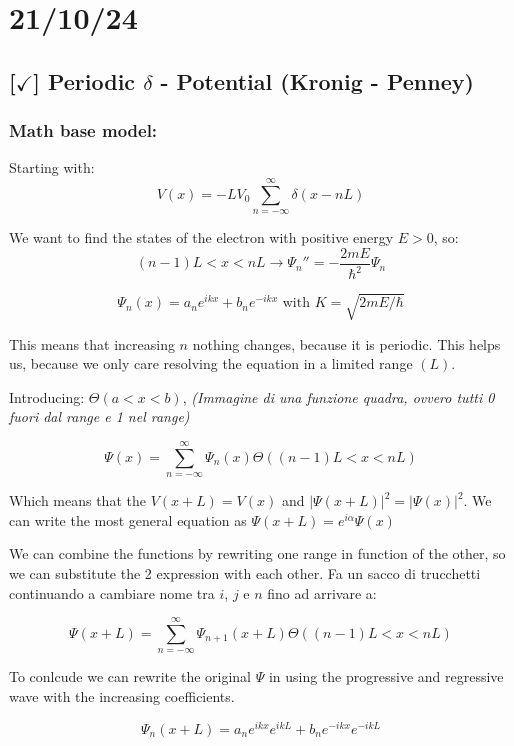 \section{21/10/24}

\subsection{[$\checkmark$] Periodic $\delta$ - Potential (Kronig - Penney)}
\subsubsection{Math base model: }

Starting with:
$$V(x) = -LV_0\sum_{n=-\infty}^{\infty} \delta (x - nL)$$

\noindent We want to find the states of the electron with positive energy $E > 0$, so:
$$(n-1)L < x < nL \longrightarrow \Psi_n'' = - \frac{2mE}{\hbar^2}\Psi_n$$

$$\Psi_n(x) = a_ne^{ikx} + b_ne^{-ikx} \text{ with } K = \sqrt{2mE / \hbar}$$

\noindent This means that increasing $n$ nothing changes, because it is periodic. This helps us, because we only care resolving the equation in a limited range $(L)$.

\vspace{10pt}

\noindent Introducing: $\Theta (a < x < b)$, \textit{(Immagine di una funzione quadra, ovvero tutti 0 fuori dal range e 1 nel range)}

$$\Psi(x) = \sum_{n=-\infty}^{\infty} \Psi_n(x) \Theta ((n-1)L < x < nL)$$

\noindent Which means that the $V(x+L) = V(x)$ and $|\Psi(x+L)|^2 = |\Psi(x)|^2$. We can write the most general equation as $\Psi(x+L) = e^{i\alpha}\Psi(x)$

\vspace{10pt}
\noindent We can combine the functions by rewriting one range in function of the other, so we can substitute the 2 expression with each other. Fa un sacco di trucchetti continuando a cambiare nome tra $i$, $j$ e $n$ fino ad arrivare a: 

$$\Psi(x+L) = \sum_{n=-\infty}^{\infty} \Psi_{n+1}(x+L)\Theta((n-1)L < x < nL)$$

\noindent To conlcude we can rewrite the original $\Psi$ in using the progressive and regressive wave with the increasing coefficients.

$$\Psi_n(x + L) = a_ne^{ikx}e^{ikL} + b_ne^{-ikx}e^{-ikL} $$

